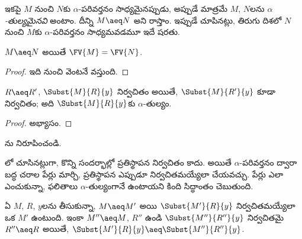 \documentclass[../../../include/open-logic-section]{subfiles}
\begin{document}
ఇకపై $M$ నుంచి $N$కు $\alpha$-పరివర్తనం సాధ్యమైనప్పుడు, అప్పుడే మాత్రమే
$M$, $N$లను \emph{$\alpha$-తుల్యమైనవి} అంటాం. దీన్ని $M \aeq N$ అని
రాస్తాం. ఇప్పుడే చూపినట్లు, తిరుగు దిశలో $N$ నుంచి $M$కు
$\alpha$-పరివర్తనం సాధ్యమవడమూ ఇదే షరతు.

\begin{thm}
  $M \aeq N$ అయితే $\FV{M} = \FV{N}$.
\end{thm}

\begin{proof}
  ఇది  నుంచి వెంటనే వస్తుంది.
\end{proof}

\begin{lem}
  $R \aeq R'$, $\Subst{M}{R}{y}$ నిర్వచితం అయితే,
  $\Subst{M}{R'}{y}$ కూడా నిర్వచితం; అది
  $\Subst{M}{R}{y}$కు $\alpha$-తుల్యం.
\end{lem}

\begin{proof}
  అభ్యాసం.
\end{proof}

\begin{prob}
  ను నిరూపించండి.
\end{prob}

లో చూసినట్లుగా, కొన్ని సందర్భాల్లో ప్రతిస్థాపన
నిర్వచితం కాదు. అయితే $\alpha$-పరివర్తనం ద్వారా బద్ధ చరాల పేర్లు
మార్చి, ప్రతిస్థాపన ఎప్పుడూ నిర్వచితమయ్యేలా చేయవచ్చు. పేర్లు ఎలా ఎంచుకున్నా,
ఫలితాలు $\alpha$-తుల్యంగానే ఉంటాయని కింది సిద్ధాంతం చెబుతుంది.

\begin{thm}
  ఏ $M$, $R$, $y$లను తీసుకున్నా, $M \aeq M'$ అయి
  $\Subst{M'}{R}{y}$ నిర్వచితమయ్యేలా ఒక $M'$ ఉంటుంది.
  ఇంకా $M'' \aeq M$, $R''$ ఉండి
  $\Subst{M''}{R''}{y}$ నిర్వచితమై $R'' \aeq R$ అయితే,
  $\Subst{M'}{R}{y} \aeq \Subst{M''}{R''}{y}$.
\end{thm}
\end{document}
